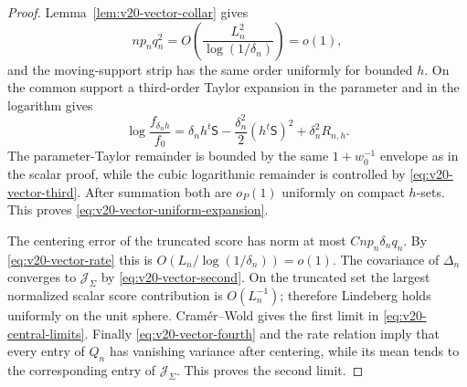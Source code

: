 \begin{proof}
Lemma~\ref{lem:v20-vector-collar} gives
\[
 np_nq_n^2
 =O\!\left(\frac{L_n^2}{\log(1/\delta_n)}\right)=o(1),
\]
and the moving-support strip has the same order uniformly for bounded
$h$.  On the common support a third-order Taylor expansion in the parameter
and in the logarithm gives
\[
 \log\frac{f_{\delta_nh}}{f_0}
 =\delta_n h^t\mathsf S
 -\frac{\delta_n^2}{2}(h^t\mathsf S)^2
 +\delta_n^2R_{n,h}.
\]
The parameter-Taylor remainder is bounded by the same
$1+w_0^{-1}$ envelope as in the scalar proof, while the cubic logarithmic
remainder is controlled by \eqref{eq:v20-vector-third}.  After summation
both are $o_P(1)$ uniformly on compact $h$-sets.  This proves
\eqref{eq:v20-vector-uniform-expansion}.

The centering error of the truncated score has norm at most
$Cnp_n\delta_nq_n$.  By \eqref{eq:v20-vector-rate} this is
$O(L_n/\log(1/\delta_n))=o(1)$.  The covariance of $\Delta_n$ converges
to $\mathcal J_\Sigma$ by \eqref{eq:v20-vector-second}.  On the truncated
set the largest normalized scalar score contribution is $O(L_n^{-1})$;
therefore Lindeberg holds uniformly on the unit sphere.  Cram\'er--Wold
gives the first limit in \eqref{eq:v20-central-limits}.  Finally
\eqref{eq:v20-vector-fourth} and the rate relation imply that every entry
of $Q_n$ has vanishing variance after centering, while its mean tends to
the corresponding entry of $\mathcal J_\Sigma$.  This proves the second
limit.
\end{proof}

